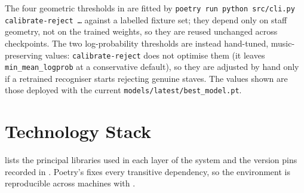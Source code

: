 The four geometric thresholds in  are fitted by \texttt{poetry run python src/cli.py calibrate-reject \ldots} against a labelled fixture set; they depend only on staff geometry, not on the trained weights, so they are reused unchanged across checkpoints. The two log-probability thresholds are instead hand-tuned, music-preserving values: \texttt{calibrate-reject} does not optimise them (it leaves \texttt{min\_mean\_logprob} at a conservative default), so they are adjusted by hand only if a retrained recogniser starts rejecting genuine staves. The values shown are those deployed with the current \texttt{models/latest/best\_model.pt}.

\section{Technology Stack}

 lists the principal libraries used in each layer
of the system and the version pins recorded in .
Poetry's  fixes every transitive dependency, so the
environment is reproducible across machines with .


